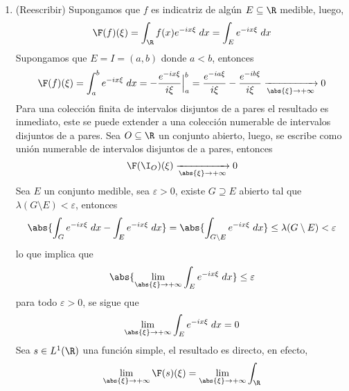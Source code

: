 \documentclass{article}
\begin{document}
\begin{enumerate}
    \item (Reescribir)
    Supongamos que $f$ es indicatriz de algún $E\subseteq\R$ medible, luego,
    \begin{equation*}
        \F(f)(\xi)=\int_{\R}f(x)e^{-ix\xi}\hspace{1mm}dx=\int_{E}e^{-ix\xi}\hspace{1mm}dx
    \end{equation*}
    Supongamos que $E=I=(a,b)$ donde $a<b$, entonces
    \begin{equation*}
        \F(f)(\xi)=\int_{a}^{b}e^{-ix\xi}\hspace{1mm}dx=-\frac{e^{-ix\xi}}{i\xi}\Big|_{a}^{b}
        =\frac{e^{-ia\xi}}{i\xi}-\frac{e^{-ib\xi}}{i\xi}\xrightarrow[\abs{\xi}\to+\infty]{}0
    \end{equation*}
    Para una colección finita de intervalos disjuntos de a pares el resultado es inmediato, este
    se puede extender a una colección numerable de intervalos disjuntos de a pares. Sea 
    $O\subseteq\R$ un conjunto abierto, luego, se escribe como unión numerable de intervalos 
    disjuntos de a pares, entonces
    \begin{equation*}
        \F(\I_{O})(\xi)\xrightarrow[\abs{\xi}\to+\infty]{}0
    \end{equation*}
    Sea $E$ un conjunto medible, sea $\varepsilon>0$, existe $G\supseteq E$ abierto tal que 
    $\lambda(G\setminus E)<\varepsilon$, entonces
    \begin{equation*}
        \abs{\int_{G}e^{-ix\xi}\hspace{1mm}dx-\int_{E}e^{-ix\xi}\hspace{1mm}dx}
        =\abs{\int_{G\setminus E}e^{-ix\xi}\hspace{1mm}dx}\leq\lambda(G\setminus E)<\varepsilon
    \end{equation*}
    lo que implica que
    \begin{equation*}
        \abs{\lim\limits_{\abs{\xi}\to+\infty}\int_{E}e^{-ix\xi}\hspace{1mm}dx}\leq\varepsilon
    \end{equation*}
    para todo $\varepsilon>0$, se sigue que
    \begin{equation*}
        \lim\limits_{\abs{\xi}\to+\infty}\int_{E}e^{-ix\xi}\hspace{1mm}dx=0
    \end{equation*}
    Sea $s\in L^{1}(\R)$ una función simple, el resultado es directo, en efecto,
    \begin{equation*}
        \lim\limits_{\abs{\xi}\to+\infty}\F(s)(\xi)=\lim\limits_{\abs{\xi}\to+\infty}\int_{\R}

\end{equation*}
\end{enumerate}
\end{document}
